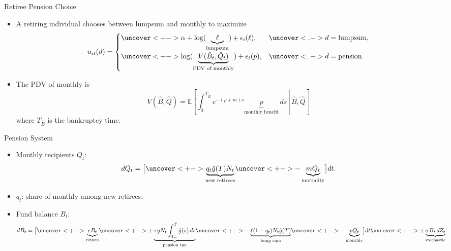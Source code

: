 \documentclass[11pt, aspectratio=169]{beamer}
\begin{document}
\begin{frame}{Retiree Pension Choice}
    \begin{itemize}[<+->]
        \item A retiring individual chooses between lumpsum and monthly to maximize
        \begin{equation*}
            u_{it}(d)=
            \begin{cases}
                \uncover<+->{\alpha+\log(\underbrace{\ell}_{\text{lumpsum}})+\epsilon_i(\ell),}
                & \uncover<.->{d=\text{lumpsum},}\\
                \uncover<+->{\log(\underbrace{V(\hat B_t,\hat Q_t)}_{\text{PDV of monthly}})+\epsilon_i(p),}
                & \uncover<.->{d=\text{pension}.}
            \end{cases}
        \end{equation*}
        \item The PDV of monthly is 
        \begin{equation*}
            V(\hat B,\hat Q)
            =\mathbb E\left[\left.\int_0^{T_{\hat B}}
            e^{-(\rho+m)s}\underbrace{p}_{\text{monthly benefit}}\,ds\,\right|\,\hat B,\hat Q\right]
        \end{equation*}
        where $T_{\hat{B}}$ is the bankruptcy time.
    \end{itemize}
\end{frame}

\begin{frame}{Pension System}
    \begin{itemize}[<+->]
        \item Monthly recipients $Q_t$:
        \begin{equation*}
            dQ_t=\big[
            \uncover<+->{\underbrace{q_t\hat g(T)N_t}_{\text{new retirees}}}
            \uncover<+->{-\underbrace{mQ_t}_{\text{mortality}}}\big]dt.
        \end{equation*}
        \item $q_t$: share of monthly among new retirees.
        \item Fund balance $B_t$: 
        \begin{align*}
            dB_t={}&\big[
            \uncover<+->{\underbrace{rB_t}_{\text{return}}}
            \uncover<+->{+\underbrace{\tau yN_t\int_{T_w}^{T}\hat g(s)\,ds}_{\text{pension tax}}}
            \uncover<+->{-\underbrace{\ell(1-q_t) N_t\hat g(T)}_{\text{lump sum}}}
            \uncover<+->{-\underbrace{pQ_t}_{\text{monthly}}}\big]dt
            \uncover<+->{+\underbrace{\sigma B_t\,dZ_t}_{\text{stochastic}}}.
        \end{align*}
    \end{itemize}
\end{frame}
\end{document}
